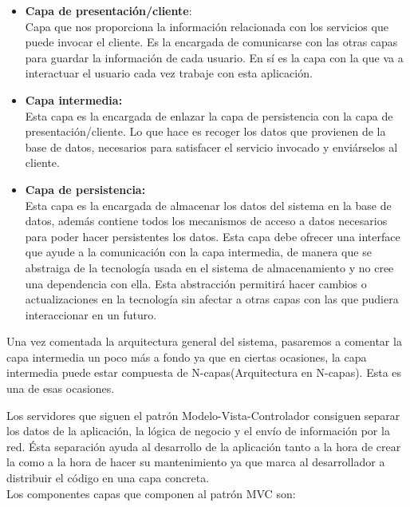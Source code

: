 \begin{itemize}
\item \textbf{Capa de presentación/cliente}:\\
Capa que nos proporciona la información relacionada con los servicios que puede invocar el cliente. Es la encargada de comunicarse con las otras capas para guardar la información de cada usuario. En sí es la capa con la que va a interactuar el usuario cada vez trabaje con esta aplicación.

\item \textbf{Capa intermedia:}\\
Esta capa es la encargada de enlazar la capa de persistencia con la capa de presentación/cliente. Lo que hace es recoger los datos que provienen de la base de datos, necesarios para satisfacer el servicio invocado y enviárselos al cliente.

\item \textbf{Capa de persistencia:}\\
Esta capa es la encargada de almacenar los datos del sistema en la base de datos, además contiene todos los mecanismos de acceso a datos necesarios para poder hacer persistentes los datos.
 Esta capa debe ofrecer una interface que ayude a la comunicación con la capa intermedia, de manera que se abstraiga de la tecnología usada en el sistema de almacenamiento y no cree una dependencia con ella. Esta abstracción permitirá hacer cambios o actualizaciones en la tecnología sin afectar a otras capas con las que pudiera interaccionar en un futuro.\\
 


\end{itemize}
Una vez comentada la arquitectura general del sistema, pasaremos a comentar la capa intermedia un poco más a fondo ya que en ciertas ocasiones, la capa intermedia puede estar compuesta de N-capas(Arquitectura en N-capas). Esta es una de esas ocasiones.

Los servidores que siguen el patrón Modelo-Vista-Controlador consiguen separar los datos de la  aplicación, la lógica de negocio  y el envío  de información por la red.
Ésta separación ayuda al desarrollo de la aplicación tanto a la hora de crear la como a la hora de hacer su mantenimiento ya que marca al desarrollador a distribuir el código en una capa concreta. \\


Los componentes capas que componen al patrón MVC son:

